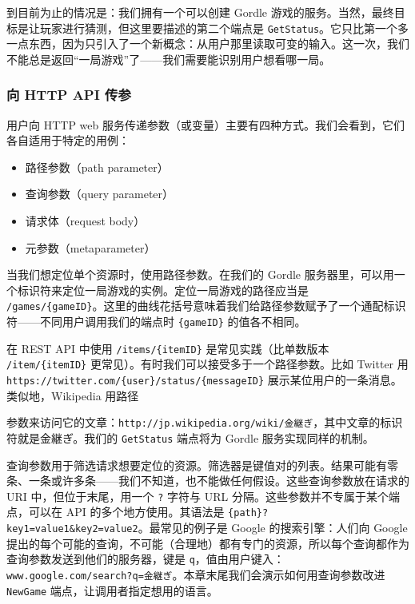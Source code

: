 到目前为止的情况是：我们拥有一个可以创建 Gordle 游戏的服务。当然，最终目标是让玩家进行猜测，但这里要描述的第二个端点是 \texttt{GetStatus}。它只比第一个多一点东西，因为只引入了一个新概念：从用户那里读取可变的输入。这一次，我们不能总是返回``一局游戏''了——我们需要能识别用户想看哪一局。

\subsubsection*{向 HTTP API 传参}

用户向 HTTP web 服务传递参数（或变量）主要有四种方式。我们会看到，它们各自适用于特定的用例：

\begin{itemize}
  \item 路径参数（path parameter）
  \item 查询参数（query parameter）
  \item 请求体（request body）
  \item 元参数（metaparameter）
\end{itemize}

当我们想定位单个资源时，使用路径参数。在我们的 Gordle 服务器里，可以用一个标识符来定位一局游戏的实例。定位一局游戏的路径应当是 \texttt{/games/\{gameID\}}。这里的曲线花括号意味着我们给路径参数赋予了一个通配标识符——不同用户调用我们的端点时 \texttt{\{gameID\}} 的值各不相同。

在 REST API 中使用 \texttt{/items/\{itemID\}} 是常见实践（比单数版本 \texttt{/item/\{itemID\}} 更常见）。有时我们可以接受多于一个路径参数。比如 Twitter 用 \texttt{https://twitter.com/\{user\}/status/\{messageID\}} 展示某位用户的一条消息。类似地，Wikipedia 用路径

参数来访问它的文章：\texttt{http://jp.wikipedia.org/wiki/金継ぎ}，其中文章的标识符就是金継ぎ。我们的 \texttt{GetStatus} 端点将为 Gordle 服务实现同样的机制。

查询参数用于筛选请求想要定位的资源。筛选器是键值对的列表。结果可能有零条、一条或许多条——我们不知道，也不能做任何假设。这些查询参数放在请求的 URI 中，但位于末尾，用一个 \texttt{?} 字符与 URL 分隔。这些参数并不专属于某个端点，可以在 API 的多个地方使用。其语法是 \texttt{\{path\}?key1=value1\&key2=value2}。最常见的例子是 Google 的搜索引擎：人们向 Google 提出的每个可能的查询，不可能（合理地）都有专门的资源，所以每个查询都作为查询参数发送到他们的服务器，键是 \texttt{q}，值由用户键入：\texttt{www.google.com/search?q=金継ぎ}。本章末尾我们会演示如何用查询参数改进 \texttt{NewGame} 端点，让调用者指定想用的语言。

